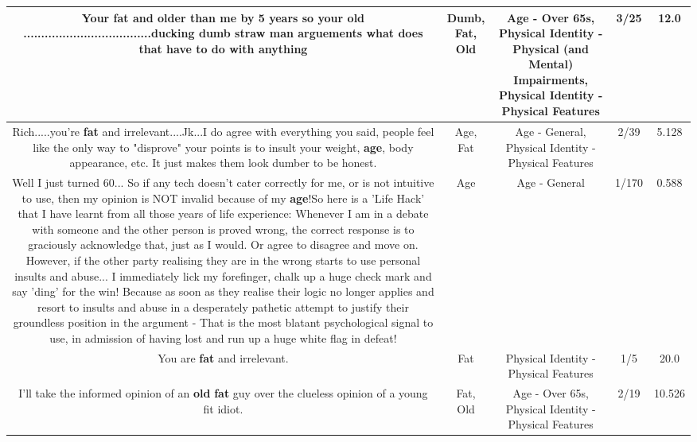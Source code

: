 \documentclass[11pt]{article}
\newlength\mylength
\begin{document}
\begin{center}
\begin{longtable}{|C{.65\mylength}|C{.30\mylength}|C{.12\mylength}|C{.12\mylength}|C{.12\mylength}|}
  \small Your \textbf{fat} and older than me by 5 years so your \textbf{old} ....................................ducking \textbf{dumb} straw man arguements what does that have to do with anything\normalsize   & Dumb, Fat, Old & Age - Over 65s, Physical Identity - Physical (and Mental) Impairments, Physical Identity - Physical Features & 3/25 & 12.0 \\  \hline
  \small Rich.....you're \textbf{fat} and irrelevant....Jk...I do agree with everything you said, people feel like the only way to "disprove" your points is to insult your weight, \textbf{age}, body appearance, etc. It just makes them look dumber to be honest.\normalsize   & Age, Fat & Age - General, Physical Identity - Physical Features & 2/39 & 5.128 \\  \hline
  \small Well I just turned 60... So if any tech doesn't cater correctly for me, or is not intuitive to use, then my opinion is NOT invalid because of my \textbf{age}!So here is a 'Life Hack' that I have learnt from all those years of life experience:  Whenever I am in a debate with someone and the other person is proved wrong, the correct response is to graciously acknowledge that, just as I would. Or agree to disagree and move on. However, if the other party realising they are in the wrong starts to use personal insults and abuse...  I immediately lick my forefinger, chalk up a huge check mark and say 'ding' for the win! Because as soon as they realise their logic no longer applies and resort to insults and abuse in a desperately pathetic attempt to justify their groundless position in the argument - That is the most blatant psychological signal to use, in admission of having lost and run up a huge white flag in defeat!\normalsize   & Age & Age - General & 1/170 & 0.588 \\  \hline
  \small You are \textbf{fat} and irrelevant.\normalsize   & Fat & Physical Identity - Physical Features & 1/5 & 20.0 \\  \hline
  \small I'll take the informed opinion of an \textbf{old} \textbf{fat} guy over the clueless opinion of a young fit idiot.\normalsize   & Fat, Old & Age - Over 65s, Physical Identity - Physical Features & 2/19 & 10.526 \\  \hline

\end{longtable}
\end{center}
\end{document}
